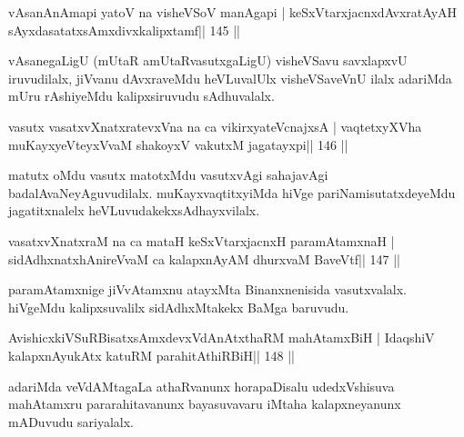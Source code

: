 

\begin{shl}
vAsanAnAmapi yatoV na visheVSoV manAgapi |
keSxVtarxjacnxdAvxratAyAH sAyxdasatatxsAmxdivxkalipxtamf\hfill || 145 ||
\end{shl}

\begin{artha}
vAsanegaLigU (mUtaR amUtaRvasutxgaLigU) visheVSavu savxlapxvU iruvudilalx, jiVvanu dAvxraveMdu heVLuvalUlx visheVSaveVnU ilalx adariMda mUru rAshiyeMdu kalipxsiruvudu sAdhuvalalx.
\end{artha}


\begin{shl}
vasutx vasatxvXnatxratevxVna na ca vikirxyateV\s cnajxsA |
vaqtetxyXVha muKayxyeVteyxVvaM shakoyxV vakutxM jagatayxpi\hfill || 146 ||
\end{shl}

\begin{artha}
matutx oMdu vasutx matotxMdu vasutxvAgi sahajavAgi  badalAvaNeyAguvudilalx. muKayxvaqtitxyiMda hiVge pariNamisutatxdeyeMdu jagatitxnalelx heVLuvudakekx\break sAdhayxvilalx.
\end{artha}

\begin{shl}
vasatxvXnatxraM na ca mataH keSxVtarxjacnxH paramAtamxnaH |
sidAdhxnatxhAnireVvaM ca kalapxnAyAM dhurxvaM BaveVtf\hfill || 147 ||
\end{shl}

\begin{artha}
paramAtamxnige jiVvAtamxnu atayxMta Binanxnenisida vasutxvalalx. hiVgeMdu kalipxsuvalilx sidAdhxMtakekx BaMga baruvudu.
\end{artha}


\begin{shl}
AvishicxkiVSuRBisatxsAmxdevxVdAnAtxthaRM mahAtamxBiH |
IdaqshiV kalapxnA\s yukAtx katuRM parahitAthiRBiH\hfill || 148 ||
\end{shl}

\begin{artha}
adariMda veVdAMtagaLa athaRvanunx horapaDisalu udedxVshisuva mahAtamxru pararahitavanunx bayasuvavaru iMtaha kalapxneyanunx mADuvudu sariyalalx.
\end{artha}


